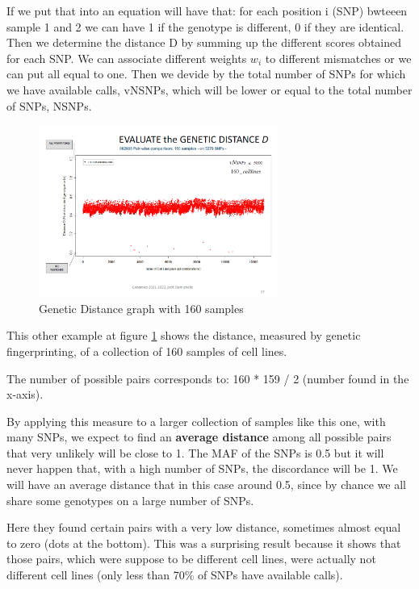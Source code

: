 If we put that into an equation will have that: for each position i (SNP) bwteeen sample 1 and 2 we can have 1 if the genotype is different, 0 if they are identical. Then we determine the distance D by summing up the different scores obtained for each SNP. We can associate different weights $w_i$ to different mismatches or we can put all equal to one. Then we devide by the total number of SNPs for which we have available calls, vNSNPs, which will be lower or equal to the total number of SNPs, NSNPs. 

%
\begin{figure}
	\centering
	\includegraphics[width=0.7\textwidth]{Images/Distance2.PNG}
	\caption{\label{fig:Distance2}Genetic Distance graph with 160 samples}
\end{figure}

\bigskip
This other example at figure \ref{fig:Distance2} shows the distance, measured by genetic fingerprinting, of a collection of 160 samples of cell lines. 

The number of possible pairs corresponds to: 160 * 159 / 2 (number found in the x-axis). 

By applying this measure to a larger collection of samples like this one, with many SNPs, we expect to find an \textbf{average distance} among all possible pairs that very unlikely will be close to 1. 
The MAF of the SNPs is 0.5 but it will never happen that, with a high number of SNPs, the discordance will be 1. We will have an average distance that in this case around 0.5, since by chance we all share some genotypes on a large number of SNPs. 

Here they found certain pairs with a very low distance, sometimes almost equal to zero (dots at the bottom). This was a surprising result because it shows that those pairs, which were suppose to be different cell lines, were actually not different cell lines (only less than 70\% of SNPs have available calls). 


